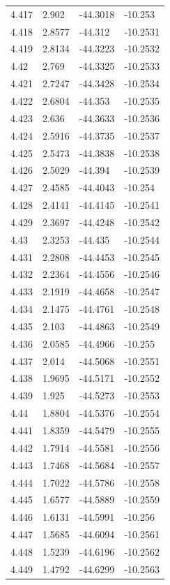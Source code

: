 \begin{tabular}{llll}
4.417 & 2.902 & -44.3018 & -10.253 \\
4.418 & 2.8577 & -44.312 & -10.2531 \\
4.419 & 2.8134 & -44.3223 & -10.2532 \\
4.42 & 2.769 & -44.3325 & -10.2533 \\
4.421 & 2.7247 & -44.3428 & -10.2534 \\
4.422 & 2.6804 & -44.353 & -10.2535 \\
4.423 & 2.636 & -44.3633 & -10.2536 \\
4.424 & 2.5916 & -44.3735 & -10.2537 \\
4.425 & 2.5473 & -44.3838 & -10.2538 \\
4.426 & 2.5029 & -44.394 & -10.2539 \\
4.427 & 2.4585 & -44.4043 & -10.254 \\
4.428 & 2.4141 & -44.4145 & -10.2541 \\
4.429 & 2.3697 & -44.4248 & -10.2542 \\
4.43 & 2.3253 & -44.435 & -10.2544 \\
4.431 & 2.2808 & -44.4453 & -10.2545 \\
4.432 & 2.2364 & -44.4556 & -10.2546 \\
4.433 & 2.1919 & -44.4658 & -10.2547 \\
4.434 & 2.1475 & -44.4761 & -10.2548 \\
4.435 & 2.103 & -44.4863 & -10.2549 \\
4.436 & 2.0585 & -44.4966 & -10.255 \\
4.437 & 2.014 & -44.5068 & -10.2551 \\
4.438 & 1.9695 & -44.5171 & -10.2552 \\
4.439 & 1.925 & -44.5273 & -10.2553 \\
4.44 & 1.8804 & -44.5376 & -10.2554 \\
4.441 & 1.8359 & -44.5479 & -10.2555 \\
4.442 & 1.7914 & -44.5581 & -10.2556 \\
4.443 & 1.7468 & -44.5684 & -10.2557 \\
4.444 & 1.7022 & -44.5786 & -10.2558 \\
4.445 & 1.6577 & -44.5889 & -10.2559 \\
4.446 & 1.6131 & -44.5991 & -10.256 \\
4.447 & 1.5685 & -44.6094 & -10.2561 \\
4.448 & 1.5239 & -44.6196 & -10.2562 \\
4.449 & 1.4792 & -44.6299 & -10.2563 \\

\end{tabular}
